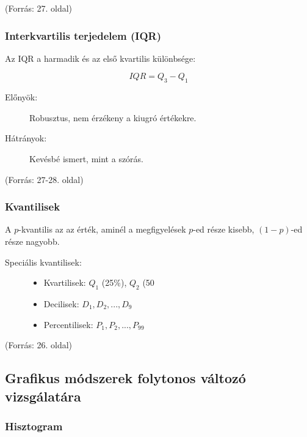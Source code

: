 \documentclass[a4paper,12pt]{article}
\begin{document}
    (Forrás: 27. oldal)

    \subsubsection{Interkvartilis terjedelem (IQR)}

    Az IQR a harmadik és az első kvartilis különbsége:

    \begin{equation}
        IQR = Q_3 - Q_1
    \end{equation}

    \begin{description}
        \item[Előnyök:] Robusztus, nem érzékeny a kiugró értékekre.
        \item[Hátrányok:] Kevésbé ismert, mint a szórás.
    \end{description}

    (Forrás: 27-28. oldal)

    \subsubsection{Kvantilisek}

    A $p$-kvantilis az az érték, aminél a megfigyelések $p$-ed része kisebb, $(1-p)$-ed része nagyobb.

    \begin{description}
        \item[Speciális kvantilisek:]
        \begin{itemize}
            \item Kvartilisek: $Q_1$ (25\%), $Q_2$ (50%
            \item Decilisek: $D_1, D_2, ..., D_9$
            \item Percentilisek: $P_1, P_2, ..., P_{99}$
        \end{itemize}
    \end{description}

    (Forrás: 26. oldal)

    \subsection{Grafikus módszerek folytonos változó vizsgálatára}

    \subsubsection{Hisztogram}
\end{document}
